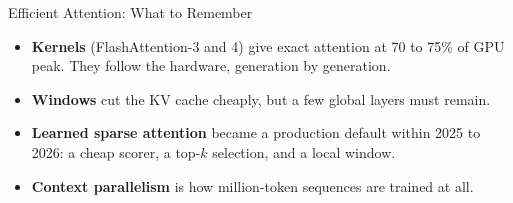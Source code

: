 \begin{frame}{Efficient Attention: What to Remember}
    \begin{itemize}\itemsep0.6em
        \item \textbf{Kernels} (FlashAttention-3 and 4) give exact attention at 70 to 75\% of GPU peak. They follow the hardware, generation by generation.
        \item \textbf{Windows} cut the KV cache cheaply, but a few global layers must remain.
        \item \textbf{Learned sparse attention} became a production default within 2025 to 2026: a cheap scorer, a top-$k$ selection, and a local window.
        \item \textbf{Context parallelism} is how million-token sequences are trained at all.
    \end{itemize}
    \vspace{0.4em}
\end{frame}

